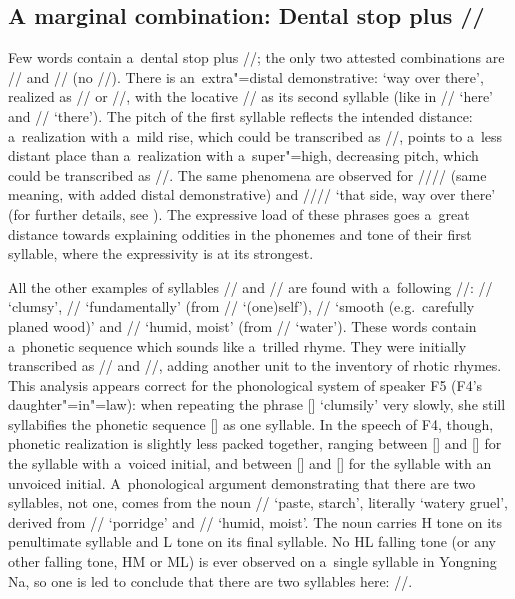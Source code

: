 			
			\subsection{A marginal combination: Dental stop plus //}
			\label{sec:dentalstopplus}
			
			Few words contain a~dental stop plus //; the only two attested combinations are // and
			// (no //). There is an~extra"=distal demonstrative: ‘way over there’, realized
			as // or //, with the locative // as its second syllable (like
			in // ‘here’ and // ‘there’). The pitch of the first syllable reflects
			the intended distance: a~realization with a~mild rise, which could be transcribed as //, points to a~less distant place than a~realization with a~super"=high, decreasing pitch, which could be transcribed as
			//. The same phenomena are observed for //{\kern2pt}//
			(same meaning, with added distal demonstrative) and
			//{\kern2pt}// ‘that side, way over there’ (for further details, see ). The expressive load
			of these phrases goes a~great distance towards explaining oddities in the phonemes and tone of their
			first syllable, where the expressivity is at its strongest.
			
			All the other examples of syllables // and // are found with a~following //: // ‘clumsy’, // ‘fundamentally’ (from //
			‘(one)self’), // ‘smooth (e.g.~carefully planed wood)’ and //
			‘humid, moist’ (from // ‘water’). These words contain a~phonetic sequence which sounds like a~trilled rhyme. They were initially
			transcribed as // and //, adding another unit to the inventory of rhotic
			rhymes. This analysis appears correct for the phonological system of speaker F5 (F4’s
			daughter"=in"=law): when repeating the phrase [] ‘clumsily’ very slowly, she
			still syllabifies the phonetic sequence [] as one syllable. In the speech of F4, though, phonetic realization is slightly less packed together, ranging between [] and [] for the syllable with a~voiced initial, and between [] and [] for the syllable with an unvoiced initial. A~phonological argument demonstrating that there are two syllables, not one, comes from the noun // ‘paste, starch’, literally
			‘watery gruel’, derived from // ‘porridge’ and // ‘humid, moist’. The noun
			carries H tone on its penultimate syllable and L tone on its final syllable. No HL falling tone (or
			any other falling tone, HM or ML) is ever observed on a~single syllable in Yongning Na, so one is
			led to conclude that there are two syllables here: //. 
			
